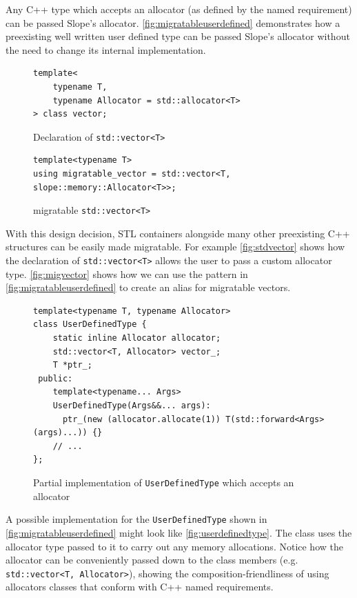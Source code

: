 Any C++ type which accepts an allocator (as defined by the named requirement)
can be passed Slope's allocator. \autoref{fig:migratableuserdefined}
demonstrates how a preexisting well written user defined type can be
passed Slope's allocator without the need to change its internal implementation.

\begin{figure}[t]
\begin{lstlisting}
template<
    typename T,
    typename Allocator = std::allocator<T>
> class vector;
\end{lstlisting}
\caption{
    Declaration of \texttt{std::vector<T>}
}
\label{fig:stdvector}
\end{figure}


\begin{figure}[t]
\begin{lstlisting}
template<typename T>
using migratable_vector = std::vector<T, slope::memory::Allocator<T>>;

\end{lstlisting}
\caption{
    migratable \texttt{std::vector<T>}
}
\label{fig:migvector}
\end{figure}

With this design decision, STL containers alongside many other preexisting
C++ structures can be easily made migratable.
For example \autoref{fig:stdvector} shows how the declaration of
\texttt{std::vector<T>}
allows the user to pass a custom allocator type. \autoref{fig:migvector} shows
how we can use the pattern in \autoref{fig:migratableuserdefined} to create
an alias for migratable vectors.



\begin{figure}[t]
\begin{lstlisting}
template<typename T, typename Allocator>
class UserDefinedType {
    static inline Allocator allocator;
    std::vector<T, Allocator> vector_;
    T *ptr_;
 public:
    template<typename... Args>
    UserDefinedType(Args&&... args):
      ptr_(new (allocator.allocate(1)) T(std::forward<Args>(args)...)) {}
    // ...
};
\end{lstlisting}
\caption{ Partial implementation of \texttt{UserDefinedType} which accepts an allocator}
\label{fig:userdefinedtype}
\end{figure}


A possible implementation for the \texttt{UserDefinedType} shown in
\autoref{fig:migratableuserdefined} might look like \autoref{fig:userdefinedtype}.
The class uses the allocator type passed to it to carry out any memory
allocations. Notice how the allocator can be conveniently passed down to the
class members (e.g. \texttt{std::vector<T, Allocator>}), showing the
composition-friendliness of using allocators classes that conform with C++ named
requirements.











